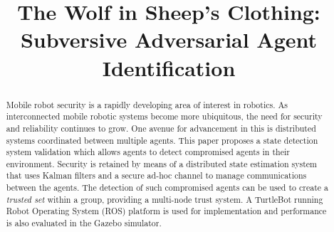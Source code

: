 \documentclass[conference]{IEEEtran}
\begin{document}
%
\title{The Wolf in Sheep's Clothing:\\
Subversive Adversarial Agent Identification}


\author{
}



\maketitle

\begin{abstract}

Mobile robot security is a rapidly developing area of interest in robotics. As interconnected mobile robotic systems become more ubiquitous, the need for security and reliability continues to grow. One avenue for advancement in this is distributed systems coordinated between multiple agents. This paper proposes a state detection system validation which allows agents to detect compromised agents in their environment. Security is retained by means of a distributed state estimation system that uses Kalman filters and a secure ad-hoc channel to manage communications between the agents. The detection of such compromised agents can be used to create a \textit{trusted set} within a group, providing a multi-node trust system. A TurtleBot running Robot Operating System (ROS) platform is used for implementation and performance is also evaluated in the Gazebo simulator.

\end{abstract}
\end{document}
